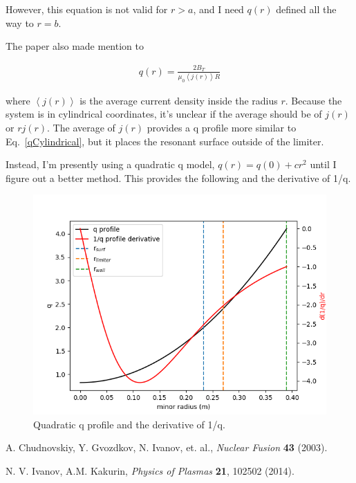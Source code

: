 \documentclass{article}
\begin{document}
\noindent However, this equation is not valid for $r>a$, and I need $q(r)$ defined all the way to $r=b$.  

The paper also made mention to 

\begin{equation} \label{qDef}
\begin{split}
q(r)=\frac{2B_T}{\mu_0 \left<j(r)\right> R}
\end{split} 
\end{equation} 

\noindent where $\left<j(r)\right>$ is the average current density inside the radius $r$.  Because the system is in cylindrical coordinates, it's unclear if the average should be of $j(r)$ or $rj(r)$.  The average of $j(r)$ provides a q profile more similar to Eq.~\ref{qCylindrical}, but it places the resonant surface outside of the limiter.  

Instead, I'm presently using a quadratic q model, $q(r)=q(0)+cr^2$ until I figure out a better method.  This provides the following and the derivative of 1/q.  



\begin{figure}[htb]
	\includegraphics[width=15cm]{images/quadraticQProfile.png}
	\caption{Quadratic q profile and the derivative of 1/q.
		\label{fig:schedule}}    
\end{figure}  




\begin{thebibliography}{}

A. Chudnovskiy, Y. Gvozdkov, N. Ivanov, et. al.,
\emph{Nuclear Fusion}
{\bf 43} (2003). 

N. V. Ivanov, A.M. Kakurin,
\emph{Physics of Plasmas}
{\bf 21}, 102502 (2014). 


\end{thebibliography}

\end{document}
